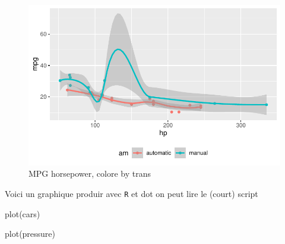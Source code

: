 \documentclass[
  a4paper,
]{scrbook}
\newenvironment{Shaded}{}{}
\newcommand{\FunctionTok}[1]{\textcolor[rgb]{0.44,0.26,0.76}{#1}}
\newcommand{\NormalTok}[1]{\textcolor[rgb]{0.14,0.16,0.18}{#1}}
\begin{document}
\begin{figure}[H]

{\centering \includegraphics{./resultats_files/figure-pdf/fig-mtcars-1.pdf}

}

\caption{\label{fig-mtcars}MPG horsepower, colore by trans}

\end{figure}

Voici un graphique produir avec \texttt{R} et dot on peut lire le
(court) script

\begin{Shaded}
\begin{Highlighting}[numbers=left,,]
\FunctionTok{plot}\NormalTok{(cars)}

\FunctionTok{plot}\NormalTok{(pressure)}
\end{Highlighting}
\end{Shaded}
\end{document}
